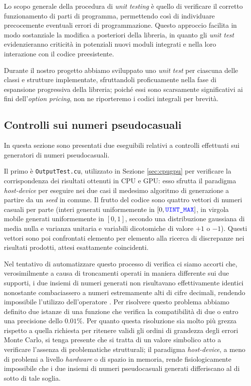 Lo scopo generale della procedura di \textit{unit testing} è quello di verificare il corretto funzionamento di parti di programma, permettendo così di individuare precocemente eventuali errori di programmazione. Questo approccio facilita in modo sostanziale la modifica a posteriori della libreria, in quanto gli \textit{unit test} evidenzieranno criticità in potenziali nuovi moduli integrati e nella loro interazione con il codice preesistente.

Durante il nostro progetto abbiamo sviluppato uno \textit{unit test} per ciascuna delle classi e strutture implementate, sfruttandoli proficuamente nella fase di espansione progressiva della libreria; poiché essi sono scarsamente significativi ai fini dell'\textit{option pricing}, non ne riporteremo i codici integrali per brevità.

\subsection{Controlli sui numeri pseudocasuali}
In questa sezione sono presentati due eseguibili relativi a controlli effettuati sui generatori di numeri pseudocasuali.

Il primo è \verb|OutputTest.cu|, utilizzato in Sezione \ref{sec:cpugpu} per verificare la corrispondenza dei risultati ottenuti in CPU e GPU: esso sfrutta il paradigma \textit{host-device} per eseguire nei due casi il medesimo algoritmo di generazione a partire da un \textit{seed} in comune. Il frutto del codice sono quattro vettori di numeri casuali per parte (interi generati uniformemente in $[0,\codeword{UINT_MAX}]$, in virgola mobile generati uniformemente in $[0,1]$, secondo una distribuzione gaussiana di media nulla e varianza unitaria e variabili dicotomiche di valore $+1$ o $-1$). Questi vettori sono poi confrontati elemento per elemento alla ricerca di discrepanze nei risultati prodotti, attesi esattamente coincidenti.

Nel tentativo di automatizzare questo processo di verifica ci siamo accorti che, verosimilmente a causa di troncamenti operati in maniera differente sui due supporti, i due insiemi di numeri generati non risultavano effettivamente identici nonostante combaciassero a numeri estremamente alti di cifre decimali, rendendo impossibile l'utilizzo dell'operatore \codeword{==}. Per risolvere questo problema abbiamo definito due istanze di una funzione  che verifica la compatibilità di due  o  entro una precisione dello $0.01\%$. Per quanto questa risoluzione sia molto più grezza rispetto a quella richiesta per ritenere validi gli ordini di grandezza degli errori Monte Carlo, si tenga presente che si tratta di un valore simbolico atto a verificare l'assenza di problematiche strutturali; il paradigma \textit{host-device}, a meno di problemi a livello \textit{hardware} o di spazio in memoria, rende fisiologicamente impossibile che i due insiemi di numeri pseudocasuali generati differiscano al di sotto di tale soglia.

